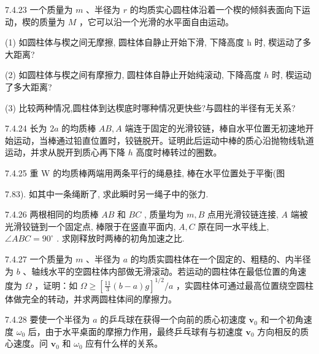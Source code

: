 \begin{problem}{7.4.23}
一个质量为 $m$ 、半径为 $r$ 的均质实心圆柱体沿着一个楔的倾斜表面向下运动，楔的质量为 $M$ ，它可以沿一个光滑的水平面自由运动。

(1) 如圆柱体与楔之间无摩擦, 圆柱体自静止开始下滑, 下降高度 h 时, 楔运动了多大距离?

(2) 如圆柱体与楔之间有摩擦力, 圆柱体自静止开始纯滚动, 下降高度 $h$ 时, 楔运动了多大距离?

(3) 比较两种情况,圆柱体到达楔底时哪种情况更快些?与圆柱的半径有无关系?
\end{problem}
\clearpage


\begin{problem}{7.4.24}
长为 $2a$ 的均质棒 $AB, A$ 端连于固定的光滑铰链，棒自水平位置无初速地开始运动，当棒通过铅直位置时，铰链脱开。证明此后运动中棒的质心沿抛物线轨道运动，并求从脱开到质心再下降 $h$ 高度时棒转过的圈数。
\end{problem}
\clearpage


\begin{problem}{7.4.25}
重 W 的均质棒两端用两条平行的绳悬挂, 棒在水平位置处于平衡(图

7.83). 如其中一条绳断了, 求此瞬时另一绳子中的张力.
\begin{center}

\end{center}
\end{problem}
\clearpage


\begin{problem}{7.4.26}
两根相同的均质棒 $AB$ 和 $BC$ , 质量均为 $m, B$ 点用光滑铰链连接, $A$ 端被光滑铰链到一个固定点, 棒限于在竖直平面内, $A, C$ 原在同一水平线上, $\angle ABC = 90^\circ$ . 求刚释放时两棒的初角加速之比.
\end{problem}
\clearpage


\begin{problem}{7.4.27}
一个质量为 $m$ 、半径为 $a$ 的均质实圆柱体在一个固定的、粗糙的、内半径为 $b$ 、轴线水平的空圆柱体内部做无滑滚动。若运动的圆柱体在最低位置的角速度为 $\Omega$ ，证明：如 $\Omega \geqslant \left[\frac{11}{3}(b - a)g\right]^{1/2} / a$ ，实圆柱体可通过最高位置绕空圆柱体做完全的转动，并求两圆柱体间的摩擦力。
\end{problem}
\clearpage


\begin{problem}{7.4.28}
要使一个半径为 $a$ 的乒乓球在获得一个向前的质心初速度 $\bm{v}_0$ 和一个初角速度 $\omega_0$ 后，由于水平桌面的摩擦力作用，最终乒乓球有与初速度 $\bm{v}_0$ 方向相反的质心速度。问 $\bm{v}_0$ 和 $\omega_0$ 应有什么样的关系。
\end{problem}
\clearpage


